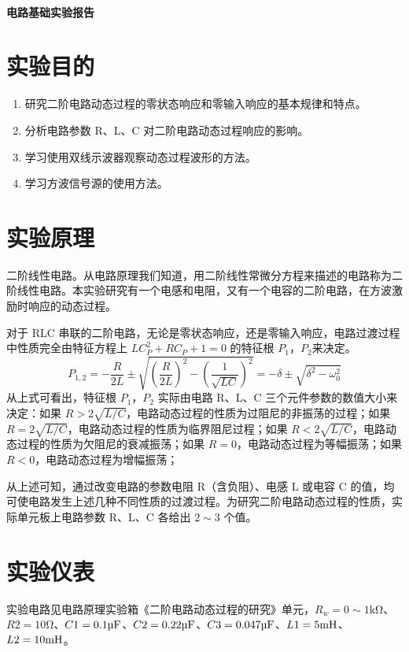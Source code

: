 \documentclass[a4paper,utf8]{article}
\begin{document}
\begin{center}
    {\mbox{}\\[7em]\bfseries\songti%
    电路基础实验报告}\\[34mm]
\end{center}
\newpage

\section{实验目的}
\begin{enumerate}
    \item 研究二阶电路动态过程的零状态响应和零输入响应的基本规律和特点。
    \item 分析电路参数 R、L、C 对二阶电路动态过程响应的影响。
    \item 学习使用双线示波器观察动态过程波形的方法。
    \item 学习方波信号源的使用方法。
\end{enumerate}

\section{实验原理}%
二阶线性电路。从电路原理我们知道，用二阶线性常微分方程来描述的电路称为二阶线性电路。本实验研究有一个电感和电阻，又有一个电容的二阶电路，在方波激励时响应的动态过程。\par
对于 RLC 串联的二阶电路，无论是零状态响应，还是零输入响应，电路过渡过程中性质完全由特征方程上 $LC_P^2+RC_P+1=0$ 的特征根 $P_1$，$P_2$来决定。
$$P_{1,2}=-\frac{R}{2L}\pm\sqrt{(\frac{R}{2L})^2-(\frac{1}{\sqrt{LC}})^2}=-\delta\pm\sqrt{\delta^2-\omega_0^2}$$
从上式可看出，特征根 $P_1$，$P_2$ 实际由电路 R、L、C 三个元件参数的数值大小来决定：如果 $R>2\sqrt{L/C}$，电路动态过程的性质为过阻尼的非振荡的过程；如果 $R=2\sqrt{L/C}$，电路动态过程的性质为临界阻尼过程；如果 $R<2\sqrt{L/C}$，电路动态过程的性质为欠阻尼的衰减振荡；如果 $R=0$，电路动态过程为等幅振荡；如果 $R<0$，电路动态过程为增幅振荡；\par
从上述可知，通过改变电路的参数电阻 R（含负阻）、电感 L 或电容 C 的值，均可使电路发生上述几种不同性质的过渡过程。为研究二阶电路动态过程的性质，实际单元板上电路参数 R、L、C 各给出 $2 \sim 3$ 个值。\par

\section{实验仪表}
    实验电路见电路原理实验箱《二阶电路动态过程的研究》单元，$R_w=0 \sim 1\unit{\kilo\ohm}$、$R2= 10\unit{\ohm}$、$C1= 0.1\unit{\uF}$、$C2= 0.22\unit{\uF}$、$C3= 0.047\unit{\uF}$、$L1= 5\unit{\mH}$、$L2= 10\unit{\mH}$。
\end{document}
